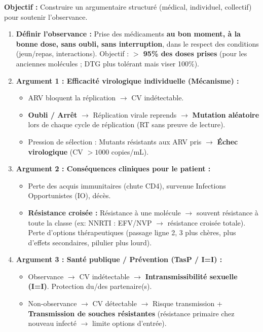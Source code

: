 \documentclass[11pt]{article}
\begin{document}
\begin{methode}
\textbf{Objectif :} Construire un argumentaire structuré (médical, individuel, collectif) pour soutenir l'observance.
\begin{enumerate}
    \item \textbf{Définir l'observance :} Prise des médicaments \textbf{au bon moment, à la bonne dose, sans oubli, sans interruption}, dans le respect des conditions (jeun/repas, interactions). Objectif : \textbf{$>$ 95\% des doses prises} (pour les anciennes molécules ; DTG plus tolérant mais viser 100\%).
    \item \textbf{Argument 1 : Efficacité virologique individuelle (Mécanisme) :}
    \begin{itemize}
        \item ARV bloquent la réplication $\rightarrow$ CV indétectable.
        \item \textbf{Oubli / Arrêt} $\rightarrow$ Réplication virale reprends $\rightarrow$ \textbf{Mutation aléatoire} lors de chaque cycle de réplication (RT sans preuve de lecture).
        \item Pression de sélection : Mutants résistants aux ARV pris $\rightarrow$ \textbf{Échec virologique} (CV $> 1000$ copies/mL).
    \end{itemize}
    \item \textbf{Argument 2 : Conséquences cliniques pour le patient :}
    \begin{itemize}
        \item Perte des acquis immunitaires (chute CD4), survenue Infections Opportunistes (IO), décès.
        \item \textbf{Résistance croisée :} Résistance à une molécule $\rightarrow$ souvent résistance à toute la classe (ex: NNRTI : EFV/NVP $\rightarrow$ résistance croisée totale). Perte d'options thérapeutiques (passage ligne 2, 3 plus chères, plus d'effets secondaires, pilulier plus lourd).
    \end{itemize}
    \item \textbf{Argument 3 : Santé publique / Prévention (TasP / I=I) :}
    \begin{itemize}
        \item Observance $\rightarrow$ CV indétectable $\rightarrow$ \textbf{Intransmissibilité sexuelle (I=I)}. Protection du/des partenaire(s).
        \item Non-observance $\rightarrow$ CV détectable $\rightarrow$ Risque transmission + \textbf{Transmission de souches résistantes} (résistance primaire chez nouveau infecté $\rightarrow$ limite options d'entrée).

\end{itemize}
\end{enumerate}
\end{methode}
\end{document}
